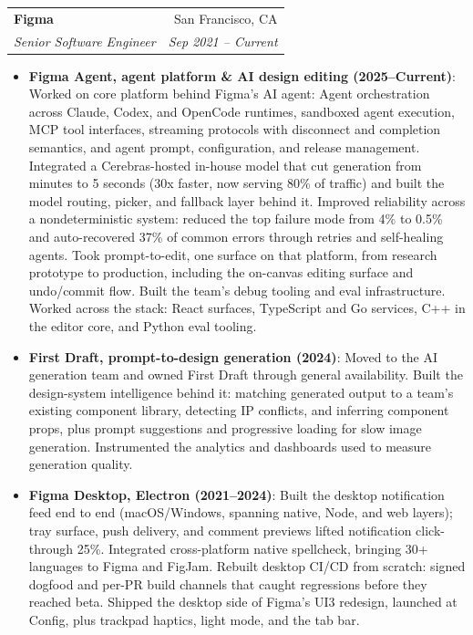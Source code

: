 \documentclass[letterpaper,10pt]{article}
\makeatletter
\newcommand{\resumeItem}[2]{
  \item\small{
    \textbf{#1}{: #2 \vspace{-2pt}}
  }
}
\newcommand{\resumeSubheading}[4]{
  \vspace{-1pt}\item
    \begin{tabular*}{0.97\linewidth}[t]{l@{\extracolsep{\fill}}r}
      \textbf{#1} & #2 \\
      \textit{\small #3} & \textit{\small #4} \\
    \end{tabular*}\vspace{-5pt}
}
\newcommand{\resumeItemListStart}{\begin{itemize}}
\newcommand{\resumeItemListEnd}{\end{itemize}\vspace{-5pt}}
\makeatother
\begin{document}
    \resumeSubheading
      {Figma}{San Francisco, CA}
      {Senior Software Engineer}{Sep 2021 -- Current}
      \resumeItemListStart
        \resumeItem{Figma Agent, agent platform \& AI design editing (2025--Current)}
          {Worked on core platform behind Figma's AI agent: Agent orchestration across Claude, Codex, and OpenCode runtimes, sandboxed agent execution, MCP tool interfaces, streaming protocols with disconnect and completion semantics, and agent prompt, configuration, and release management. Integrated a Cerebras-hosted in-house model that cut generation from minutes to 5 seconds (30x faster, now serving 80\% of traffic) and built the model routing, picker, and fallback layer behind it. Improved reliability across a nondeterministic system: reduced the top failure mode from 4\% to 0.5\% and auto-recovered 37\% of common errors through retries and self-healing agents. Took prompt-to-edit, one surface on that platform, from research prototype to production, including the on-canvas editing surface and undo/commit flow. Built the team's debug tooling and eval infrastructure. Worked across the stack: React surfaces, TypeScript and Go services, C++ in the editor core, and Python eval tooling.}
        \resumeItem{First Draft, prompt-to-design generation (2024)}
          {Moved to the AI generation team and owned First Draft through general availability. Built the design-system intelligence behind it: matching generated output to a team's existing component library, detecting IP conflicts, and inferring component props, plus prompt suggestions and progressive loading for slow image generation. Instrumented the analytics and dashboards used to measure generation quality.}
        \resumeItem{Figma Desktop, Electron (2021--2024)}
          {Built the desktop notification feed end to end (macOS/Windows, spanning native, Node, and web layers); tray surface, push delivery, and comment previews lifted notification click-through 25\%. Integrated cross-platform native spellcheck, bringing 30+ languages to Figma and FigJam. Rebuilt desktop CI/CD from scratch: signed dogfood and per-PR build channels that caught regressions before they reached beta. Shipped the desktop side of Figma's UI3 redesign, launched at Config, plus trackpad haptics, light mode, and the tab bar.}
      \resumeItemListEnd
\end{document}
